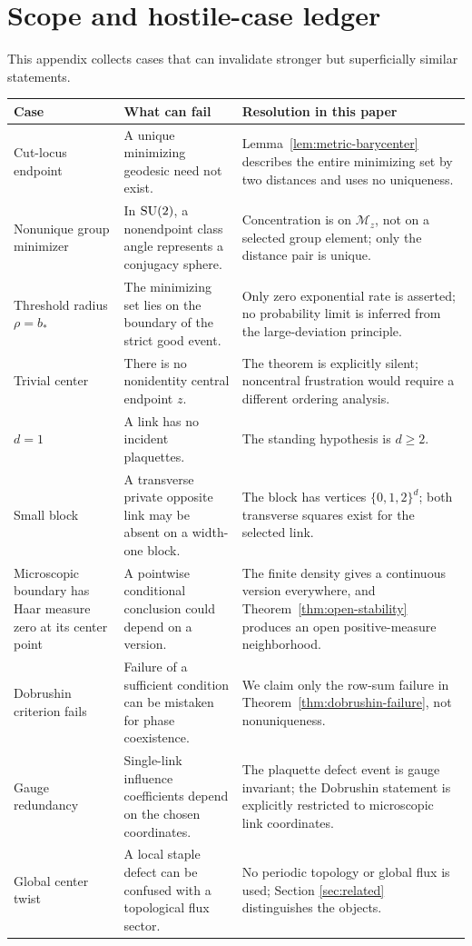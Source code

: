 \section{Scope and hostile-case ledger}
\label{app:stress-tests}

This appendix collects cases that can invalidate stronger but superficially
similar statements.

\begin{longtable}{@{}p{}p{}p{}@{}}
\toprule
Case & What can fail & Resolution in this paper \\
\midrule
\endhead
Cut-locus endpoint & A unique minimizing geodesic need not exist. &
Lemma~\ref{lem:metric-barycenter} describes the entire minimizing set by two
distances and uses no uniqueness. \\
\addlinespace
Nonunique group minimizer & In $\mathrm{SU}(2)$, a nonendpoint class angle represents
a conjugacy sphere. & Concentration is on $\mathcal M_z$, not on a selected
group element; only the distance pair is unique. \\
\addlinespace
Threshold radius $\rho=b_*$ & The minimizing set lies on the boundary of the
strict good event. & Only zero exponential rate is asserted; no probability
limit is inferred from the large-deviation principle. \\
\addlinespace
Trivial center & There is no nonidentity central endpoint $z$. & The theorem
is explicitly silent; noncentral frustration would require a different
ordering analysis. \\
\addlinespace
$d=1$ & A link has no incident plaquettes. & The standing hypothesis is
$d\geq2$. \\
\addlinespace
Small block & A transverse private opposite link may be absent on a width-one
block. & The block has vertices $\{0,1,2\}^d$; both transverse squares exist
for the selected link. \\
\addlinespace
Microscopic boundary has Haar measure zero at its center point & A pointwise
conditional conclusion could depend on a version. & The finite density gives
a continuous version everywhere, and Theorem~\ref{thm:open-stability}
produces an open positive-measure neighborhood. \\
\addlinespace
Dobrushin criterion fails & Failure of a sufficient condition can be mistaken
for phase coexistence. & We claim only the row-sum failure in
Theorem~\ref{thm:dobrushin-failure}, not nonuniqueness. \\
\addlinespace
Gauge redundancy & Single-link influence coefficients depend on the chosen
coordinates. & The plaquette defect event is gauge invariant; the Dobrushin
statement is explicitly restricted to microscopic link coordinates. \\
\addlinespace
Global center twist & A local staple defect can be confused with a topological
flux sector. & No periodic topology or global flux is used; Section
\ref{sec:related} distinguishes the objects. \\
\bottomrule
\end{longtable}

